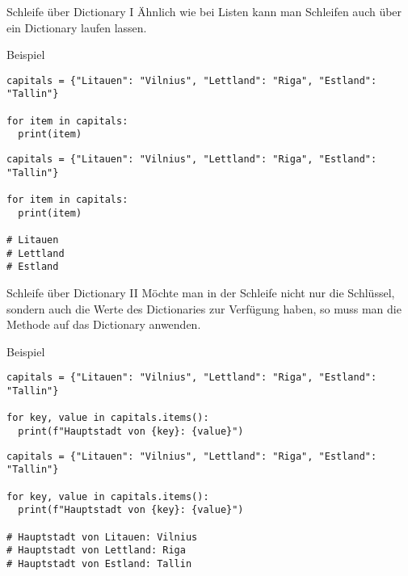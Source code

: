\begin{fragile}
\begin{block}{Schleife über Dictionary I}
\vspace{2pt}
Ähnlich wie bei Listen kann man Schleifen auch über ein Dictionary laufen lassen.  
\end{block}
\vspace{12pt}
\pause 

\begin{exampleblock}{Beispiel}
\vspace{2pt}
\begin{overprint}
\begin{verbatim}
capitals = {"Litauen": "Vilnius", "Lettland": "Riga", "Estland": "Tallin"}

for item in capitals:
  print(item)
\end{verbatim}
\begin{verbatim}
capitals = {"Litauen": "Vilnius", "Lettland": "Riga", "Estland": "Tallin"}

for item in capitals:
  print(item)

# Litauen
# Lettland
# Estland
\end{verbatim}
\end{overprint}
\end{exampleblock}
\end{fragile}

\begin{fragile}
\begin{block}{Schleife über Dictionary II}
\vspace{2pt}
Möchte man in der Schleife nicht nur die Schlüssel, sondern auch die Werte des Dictionaries zur Verfügung haben, so muss man die Methode  auf das Dictionary anwenden.   
\end{block}
\vspace{12pt}
\pause 


\begin{exampleblock}{Beispiel}
\vspace{2pt}
\begin{overprint}
\begin{verbatim}
capitals = {"Litauen": "Vilnius", "Lettland": "Riga", "Estland": "Tallin"}

for key, value in capitals.items():
  print(f"Hauptstadt von {key}: {value}")
\end{verbatim}
\begin{verbatim}
capitals = {"Litauen": "Vilnius", "Lettland": "Riga", "Estland": "Tallin"}

for key, value in capitals.items():
  print(f"Hauptstadt von {key}: {value}")

# Hauptstadt von Litauen: Vilnius
# Hauptstadt von Lettland: Riga
# Hauptstadt von Estland: Tallin
\end{verbatim}
\end{overprint}
\end{exampleblock}
\end{fragile}

